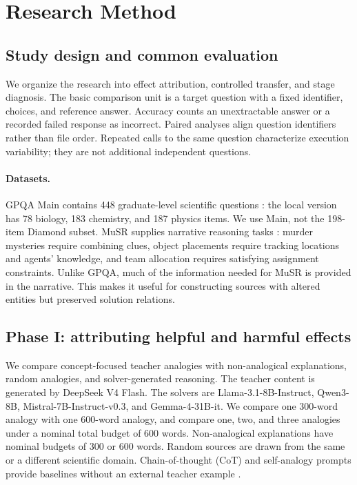 \section{Research Method}
\label{sec:method}
\subsection{Study design and common evaluation}
We organize the research into effect attribution, controlled transfer, and stage diagnosis. The basic comparison unit is a target question with a fixed identifier, choices, and reference answer. Accuracy counts an unextractable answer or a recorded failed response as incorrect. Paired analyses align question identifiers rather than file order. Repeated calls to the same question characterize execution variability; they are not additional independent questions.

\paragraph{Datasets.}
GPQA Main contains 448 graduate-level scientific questions \citep{rein2023gpqa}: the local version has 78 biology, 183 chemistry, and 187 physics items. We use Main, not the 198-item Diamond subset. MuSR supplies narrative reasoning tasks \citep{sprague2024musr}: murder mysteries require combining clues, object placements require tracking locations and agents' knowledge, and team allocation requires satisfying assignment constraints. Unlike GPQA, much of the information needed for MuSR is provided in the narrative. This makes it useful for constructing sources with altered entities but preserved solution relations.

\subsection{Phase I: attributing helpful and harmful effects}
\label{sec:phase1method}
We compare concept-focused teacher analogies with non-analogical explanations, random analogies, and solver-generated reasoning. The teacher content is generated by DeepSeek V4 Flash. The solvers are Llama-3.1-8B-Instruct, Qwen3-8B, Mistral-7B-Instruct-v0.3, and Gemma-4-31B-it. We compare one 300-word analogy with one 600-word analogy, and compare one, two, and three analogies under a nominal total budget of 600 words. Non-analogical explanations have nominal budgets of 300 or 600 words. Random sources are drawn from the same or a different scientific domain. Chain-of-thought (CoT) and self-analogy prompts provide baselines without an external teacher example \citep{wei2022cot,kojima2022zero}.

